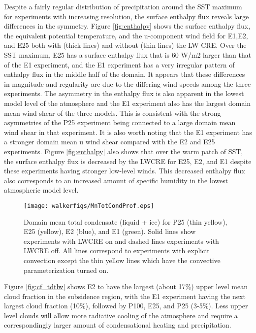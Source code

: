 \documentclass[11pt]{article}   	%
\begin{document}
Despite a fairly regular distribution of precipitation around the SST maximum for experiments with increasing resolution, the 
surface enthalpy flux reveals large differences in the symmetry.   Figure \ref{fig:enthalpy} shows the surface enthalpy flux, 
the equivalent potential temperature, and the u-component wind field for E1,E2, and E25 both with (thick lines) and 
without (thin lines) the LW CRE.  
Over the SST maximum, E25 has a surface enthalpy flux that is 
60 W/m2 larger than that of the E1 experiment, and the E1 experiment has a very irregular pattern of enthalpy flux in the middle
half of the domain.  It appears that these differences in magnitude and regularity are due to the differing wind speeds among 
the three experiments.  The asymmetry in the enthalpy flux is also apparent in the lowest model level of the atmosphere
and the E1 experiment also has the largest domain mean wind shear of the three models.  This is consistent with the 
strong asymmetries of the P25 experiment being connected to a large domain mean wind shear in that experiment.  
It is also worth noting that the E1 experiment has a stronger domain mean u wind shear compared 
with the E2 and E25 experiments.  Figure \ref{fig:enthalpy} also shows that over the warm patch of SST, the surface 
enthalpy flux is decreased by the LWCRE for E25, E2, and E1 despite these experiments having stronger low-level winds.  
This decreased enthalpy flux also corresponds to an increased amount of specific humidity in the lowest atmospheric 
model level.        


\begin{figure}
  \centering
      \texttt{[image: walkerfigs/MnTotCondProf.eps]}
          \caption{Domain mean total condensate (liquid + ice) for P25 (thin yellow), E25 (yellow), 
          E2 (blue), and E1 (green).  Solid lines show experiments with LWCRE on
          and dashed lines experiments with LWCRE off.  All lines correspond to experiments with explicit 
          convection except the thin yellow lines which have the convective parameterization turned on.}
  \label{fig:TotCond}
\end{figure}

Figure \ref{fig:cf_tdtlw} shows E2 to have the largest (about 17\%) upper level mean cloud
fraction in the subsidence region, with the E1 experiment having the next largest cloud fraction (10\%), followed by 
P100, E25, and P25 (3-5\%).   Less upper level clouds will allow more radiative cooling of the atmosphere and 
require a correspondingly larger amount of condensational heating and precipitation.    
\end{document}

